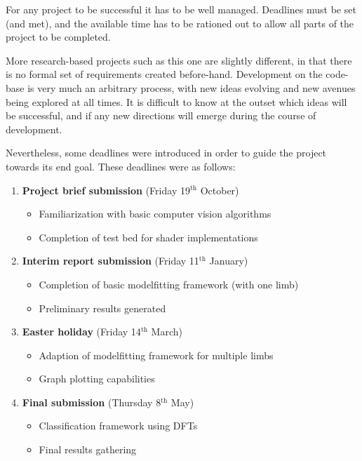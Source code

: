 For any project to be successful it has to be well managed.
Deadlines must be set (and met), and the available time has to be rationed out to allow all parts of the project to be completed.

More research-based projects such as this one are slightly different, in that there is no formal set of requirements created before-hand.
Development on the code-base is very much an arbitrary process, with new ideas evolving and new avenues being explored at all times.
It is difficult to know at the outset which ideas will be successful, and if any new directions will emerge during the course of development.

Nevertheless, some deadlines were introduced in order to guide the project towards its end goal.
These deadlines were as follows:

\begin{enumerate}
	\item \textbf{Project brief submission} (Friday 19$^\text{th}$ October)
	\begin{itemize}
		\item Familiarization with basic computer vision algorithms
		\item Completion of test bed for shader implementations
	\end{itemize}
	
	\item \textbf{Interim report submission} (Friday 11$^\text{th}$ January)
	\begin{itemize}
		\item Completion of basic modelfitting framework (with one limb)
		\item Preliminary results generated
	\end{itemize}
	
	\item \textbf{Easter holiday} (Friday 14$^\text{th}$ March)
	\begin{itemize}
		\item Adaption of modelfitting framework for multiple limbs
		\item Graph plotting capabilities
	\end{itemize}
	
	\item \textbf{Final submission} (Thursday 8$^\text{th}$ May)
	\begin{itemize}
		\item Classification framework using DFTs
		\item Final results gathering
	\end{itemize}
\end{enumerate}

